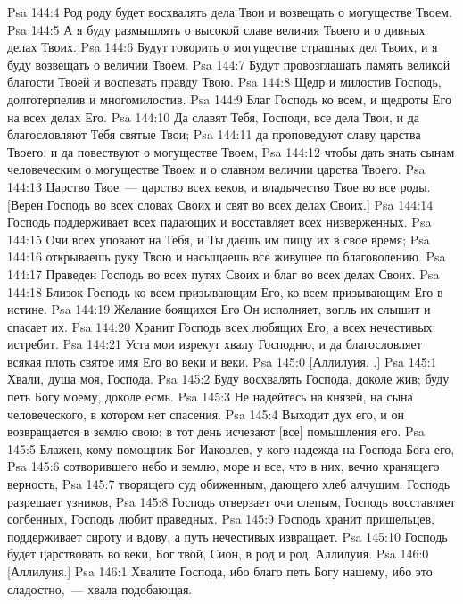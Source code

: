 \vs Psa 144:4 Род роду будет восхвалять дела Твои и возвещать о могуществе Твоем.
\vs Psa 144:5 А я буду размышлять о высокой славе величия Твоего и о дивных делах Твоих.
\vs Psa 144:6 Будут говорить о могуществе страшных дел Твоих, и я буду возвещать о величии Твоем.
\vs Psa 144:7 Будут провозглашать память великой благости Твоей и воспевать правду Твою.
\vs Psa 144:8 Щедр и милостив Господь, долготерпелив и многомилостив.
\vs Psa 144:9 Благ Господь ко всем, и щедроты Его на всех делах Его.
\vs Psa 144:10 Да славят Тебя, Господи, все дела Твои, и да благословляют Тебя святые Твои;
\vs Psa 144:11 да проповедуют славу царства Твоего, и да повествуют о могуществе Твоем,
\vs Psa 144:12 чтобы дать знать сынам человеческим о могуществе Твоем и о славном величии царства Твоего.
\vs Psa 144:13 Царство Твое~--- царство всех веков, и владычество Твое во все роды. [Верен Господь во всех словах Своих и свят во всех делах Своих.]
\vs Psa 144:14 Господь поддерживает всех падающих и восставляет всех низверженных.
\vs Psa 144:15 Очи всех уповают на Тебя, и Ты даешь им пищу их в свое время;
\vs Psa 144:16 открываешь руку Твою и насыщаешь все живущее по благоволению.
\vs Psa 144:17 Праведен Господь во всех путях Своих и благ во всех делах Своих.
\vs Psa 144:18 Близок Господь ко всем призывающим Его, ко всем призывающим Его в истине.
\vs Psa 144:19 Желание боящихся Его Он исполняет, вопль их слышит и спасает их.
\vs Psa 144:20 Хранит Господь всех любящих Его, а всех нечестивых истребит.
\vs Psa 144:21 Уста мои изрекут хвалу Господню, и да благословляет всякая плоть святое имя Его во веки и веки.
\vs Psa 145:0 [Аллилуия. .]
\rsbpar\vs Psa 145:1 Хвали, душа моя, Господа.
\vs Psa 145:2 Буду восхвалять Господа, доколе жив; буду петь Богу моему, доколе есмь.
\vs Psa 145:3 Не надейтесь на князей, на сына человеческого, в котором нет спасения.
\vs Psa 145:4 Выходит дух его, и он возвращается в землю свою: в тот день исчезают [все] помышления его.
\vs Psa 145:5 Блажен, кому помощник Бог Иаковлев, у кого надежда на Господа Бога его,
\vs Psa 145:6 сотворившего небо и землю, море и все, что в них, вечно хранящего верность,
\vs Psa 145:7 творящего суд обиженным, дающего хлеб алчущим. Господь разрешает узников,
\vs Psa 145:8 Господь отверзает очи слепым, Господь восставляет согбенных, Господь любит праведных.
\vs Psa 145:9 Господь хранит пришельцев, поддерживает сироту и вдову, а путь нечестивых извращает.
\vs Psa 145:10 Господь будет царствовать во веки, Бог твой, Сион, в род и род. Аллилуия.
\vs Psa 146:0 [Аллилуия.]
\rsbpar\vs Psa 146:1 Хвалите Господа, ибо благо петь Богу нашему, ибо это сладостно,~--- хвала подобающая.
